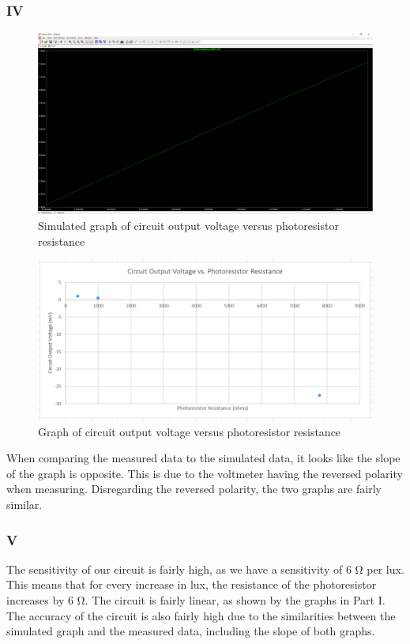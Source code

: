 \documentclass[10pt]{article}
\begin{document}
\subsubsection*{IV}
\begin{figure}[H]
	\centering
	\includegraphics[width=\textwidth]{4}
	\caption{Simulated graph of circuit output voltage versus photoresistor resistance}
\end{figure}
\begin{figure}[H]
	\centering
	\includegraphics[width=\textwidth]{LSC}
	\caption{Graph of circuit output voltage versus photoresistor resistance}
\end{figure}

When comparing the measured data to the simulated data, it looks like the slope of the graph is opposite. This is due to the voltmeter having the reversed polarity when measuring. Disregarding the reversed polarity, the two graphs are fairly similar.

\subsubsection*{V}
The sensitivity of our circuit is fairly high, as we have a sensitivity of 6 \si{\ohm} per lux. This means that for every increase in lux, the resistance of the photoresistor increases by 6 \si{\ohm}. The circuit is fairly linear, as shown by the graphs in Part I. The accuracy of the circuit is also fairly high due to the similarities between the simulated graph and the measured data, including the slope of both graphs.
\end{document}
